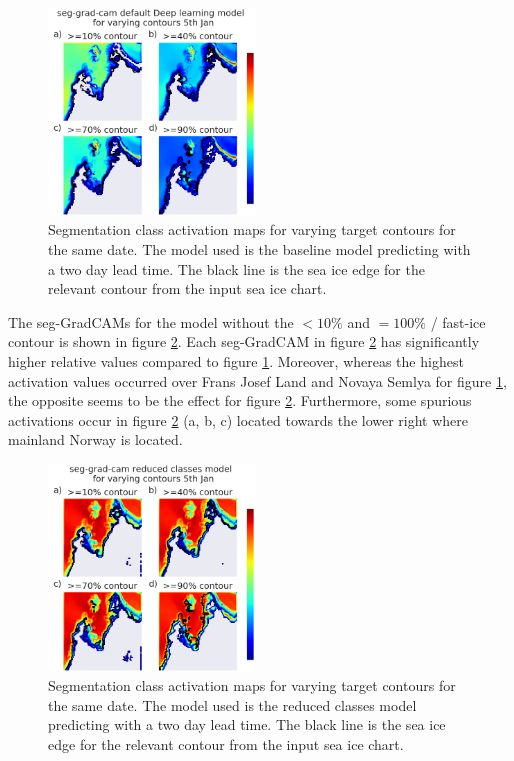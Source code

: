 \documentclass[../main/thesis.tex]{subfiles}
\begin{document}
\begin{figure}
    \centering
    \includegraphics[width=0.49\textwidth]{baseline_contours}
    \caption{\label{fig:seg_base_cont}Segmentation class activation maps for varying target contours for the same date. The model used is the baseline model predicting with a two day lead time. The black line is the sea ice edge for the relevant contour from the input sea ice chart.}
\end{figure}

The seg-GradCAMs for the model without the $<10\%$ and $=100\%$ / fast-ice contour is shown in figure \ref{fig:seg_red_cont}. Each seg-GradCAM in figure \ref{fig:seg_red_cont} has significantly higher relative values compared to figure \ref{fig:seg_base_cont}. Moreover, whereas the highest activation values occurred over Frans Josef Land and Novaya Semlya for figure \ref{fig:seg_base_cont}, the opposite seems to be the effect for figure \ref{fig:seg_red_cont}. Furthermore, some spurious activations occur in figure \ref{fig:seg_red_cont} (a, b, c) located towards the lower right where mainland Norway is located.

\begin{figure}
    \centering
    \includegraphics[width=0.49\textwidth]{reduced_classes_contours}
    \caption{\label{fig:seg_red_cont}Segmentation class activation maps for varying target contours for the same date. The model used is the reduced classes model predicting with a two day lead time. The black line is the sea ice edge for the relevant contour from the input sea ice chart.}
\end{figure}
\end{document}
